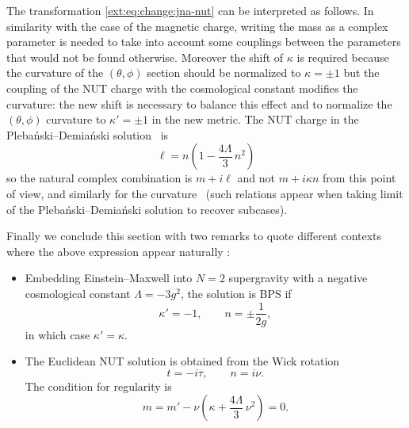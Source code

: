 The transformation \eqref{ext:eq:change:jna-nut} can be interpreted as follows.
In similarity with the case of the magnetic charge, writing the mass as a complex parameter is needed to take into account some couplings between the parameters that would not be found otherwise.
Moreover the shift of $\kappa$ is required because the curvature of the $(\theta, \phi)$ section should be normalized to $\kappa = \pm 1$ but the coupling of the NUT charge with the cosmological constant modifies the curvature: the new shift is necessary to balance this effect and to normalize the $(\theta, \phi)$ curvature to $\kappa' = \pm 1$ in the new metric.
The NUT charge in the Plebański--Demiański solution~\cite{Plebanski:1975:ClassSolutionsEinsteinMaxwell, Plebanski:1976:RotatingChargedUniformly} is
\begin{equation}
	\ell = n \left( 1 - \frac{4\Lambda}{3}\, n^2 \right)
\end{equation} 
so the natural complex combination is $m + i \ell$ and not $m + i \kappa n$ from this point of view, and similarly for the curvature~\cite[sec.~5.3]{Griffiths:2006:NewLookPlebanskiDemianski} (such relations appear when taking limit of the Plebański--Demiański solution to recover subcases).

Finally we conclude this section with two remarks to quote different contexts where the above expression appear naturally :
\begin{itemize}
	\item Embedding Einstein--Maxwell into $N = 2$ supergravity with a negative cosmological constant $\Lambda = - 3 g^2$, the solution is BPS if~\cite{AlonsoAlberca:2000:SupersymmetryTopologicalKerrNewmannTaubNUTaDS}
	\begin{equation}
		\kappa' = -1, \qquad
		n = \pm \frac{1}{2g},
	\end{equation} 
	in which case $\kappa' = \kappa$.
	
	\item The Euclidean NUT solution is obtained from the Wick rotation
	\begin{equation}
		t = - i \tau, \qquad
		n = i \nu.
	\end{equation}
	The condition for regularity is~\cite{Chamblin:1999:LargeNPhases, Johnson:2014:ThermodynamicVolumesAdSTaubNUT}
	\begin{equation}
		m = m' - \nu \left( \kappa + \frac{4\Lambda}{3}\, \nu^2 \right)
			= 0.
	\end{equation} 
\end{itemize}


